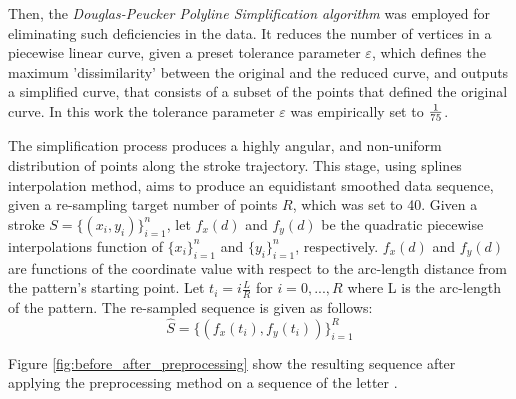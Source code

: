 \documentclass[10pt, conference, compsocconf]{IEEEtran}
\theoremstyle{definition}
\begin{document}
Then, the \emph{Douglas-Peucker Polyline Simplification algorithm} \cite{douglas1973algorithms} was employed for eliminating such deficiencies in the data. 
It reduces the number of vertices in a piecewise linear curve, given a preset tolerance parameter $\varepsilon$, which defines the maximum 'dissimilarity' between the original and the reduced curve, and outputs a simplified curve, that consists of a subset of the points that defined the original curve.
In this work the tolerance parameter $\varepsilon$ was empirically set to ${1 \over 75}$.

The simplification process produces a highly angular, and non-uniform distribution of points along the stroke trajectory.
This stage, using splines interpolation method, aims to produce an equidistant smoothed data sequence, given a re-sampling target number of points $R$, which was set to 40. 
Given a stroke $S=\{(x_i,y_i)\}_{i=1}^{n}$, let $f_{x}(d)$ and $f_{y}(d)$ be the quadratic piecewise interpolations function of $\{x_i\}_{i=1}^{n}$ and $\{y_i\}_{i=1}^{n}$, respectively. 
$f_{x}(d)$ and $f_{y}(d)$ are functions of the coordinate value with respect to the arc-length distance from the pattern's starting point. 
Let $t_i=i\frac{L}{R}$ for $i=0,...,R$ where L is the arc-length of the pattern.
The re-sampled sequence is given as follows:
\begin{equation}
\widehat{S}=\{(f_x(t_i),f_y(t_i))\}_{i=1}^{R}
\end{equation}

Figure \ref{fig:before_after_preprocessing} show the resulting sequence after applying the preprocessing method on a sequence of the letter . 
\end{document}
